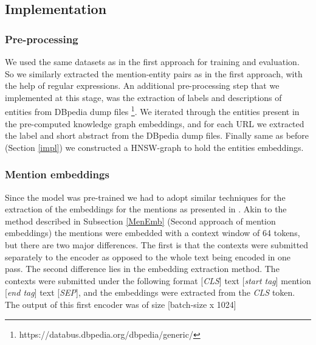 \subsection{Implementation}
\subsubsection{Pre-processing}
We used the same datasets as in the first approach for training and evaluation. So we similarly extracted the mention-entity pairs as in the first approach, with the help of regular expressions.\newline
An additional pre-processing step that we implemented at this stage, was the extraction of labels and descriptions of entities from DBpedia dump files \footnote{https://databus.dbpedia.org/dbpedia/generic/}.\newline
We iterated through the entities present in the pre-computed knowledge graph embeddings, and for each URL we extracted the label and short abstract from the DBpedia dump files.\newline
Finally same as before (Section \ref{impl}) we constructed a HNSW-graph to hold the entities embeddings.\newline
\subsubsection{Mention embeddings}
Since the model was pre-trained we had to adopt similar techniques for the extraction of the embeddings for the mentions as presented in \cite{Wu2020}. Akin to the method described in Subsection \ref{MenEmb} (Second approach of mention embeddings) the mentions were embedded with a context window of 64 tokens, but there are two major differences. The first is that the contexts were submitted separately to the encoder as opposed to the whole text being encoded in one pass.\newline
The second difference lies in the embedding extraction method. The contexts were submitted under the following format [\textit{CLS}] text [\textit{start tag}] mention [\textit{end tag}] text [\textit{SEP}], and the embeddings were extracted from the \textit{CLS} token.\newline
The output of this first encoder was of size [batch-size x 1024]

